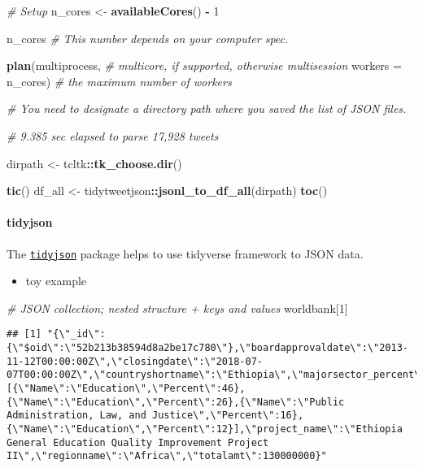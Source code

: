 \documentclass[
]{book}
\newenvironment{Shaded}{\begin{snugshade}}{\end{snugshade}}
\newcommand{\CommentTok}[1]{\textcolor[rgb]{0.56,0.35,0.01}{\textit{#1}}}
\newcommand{\DataTypeTok}[1]{\textcolor[rgb]{0.13,0.29,0.53}{#1}}
\newcommand{\DecValTok}[1]{\textcolor[rgb]{0.00,0.00,0.81}{#1}}
\newcommand{\KeywordTok}[1]{\textcolor[rgb]{0.13,0.29,0.53}{\textbf{#1}}}
\newcommand{\NormalTok}[1]{#1}
\newcommand{\OperatorTok}[1]{\textcolor[rgb]{0.81,0.36,0.00}{\textbf{#1}}}
\newcommand{\StringTok}[1]{\textcolor[rgb]{0.31,0.60,0.02}{#1}}
\providecommand{\tightlist}{%
  \setlength{\itemsep}{0pt}\setlength{\parskip}{0pt}}
\begin{document}
\begin{Shaded}
\begin{Highlighting}[]
\CommentTok{\# Setup }
\NormalTok{n\_cores \textless{}{-}}\StringTok{ }\KeywordTok{availableCores}\NormalTok{() }\OperatorTok{{-}}\StringTok{ }\DecValTok{1}

\NormalTok{n\_cores }\CommentTok{\# This number depends on your computer spec.}

\KeywordTok{plan}\NormalTok{(multiprocess, }\CommentTok{\# multicore, if supported, otherwise multisession}
     \DataTypeTok{workers =}\NormalTok{ n\_cores) }\CommentTok{\# the maximum number of workers}

\CommentTok{\# You need to designate a directory path where you saved the list of JSON files.}

\CommentTok{\# 9.385 sec elapsed to parse 17,928 tweets }

\NormalTok{dirpath \textless{}{-}}\StringTok{ }\NormalTok{tcltk}\OperatorTok{::}\KeywordTok{tk\_choose.dir}\NormalTok{()}

\KeywordTok{tic}\NormalTok{()}
\NormalTok{df\_all \textless{}{-}}\StringTok{ }\NormalTok{tidytweetjson}\OperatorTok{::}\KeywordTok{jsonl\_to\_df\_all}\NormalTok{(dirpath)}
\KeywordTok{toc}\NormalTok{()}
\end{Highlighting}
\end{Shaded}

\hypertarget{tidyjson}{%
\paragraph{tidyjson}\label{tidyjson}}

The \href{https://cran.r-project.org/web/packages/tidyjson/vignettes/introduction-to-tidyjson.html}{\texttt{tidyjson}} package helps to use tidyverse framework to JSON data.

\begin{itemize}
\tightlist
\item
  toy example
\end{itemize}

\begin{Shaded}
\begin{Highlighting}[]
\CommentTok{\# JSON collection; nested structure + keys and values }
\NormalTok{worldbank[}\DecValTok{1}\NormalTok{]}
\end{Highlighting}
\end{Shaded}

\begin{verbatim}
## [1] "{\"_id\":{\"$oid\":\"52b213b38594d8a2be17c780\"},\"boardapprovaldate\":\"2013-11-12T00:00:00Z\",\"closingdate\":\"2018-07-07T00:00:00Z\",\"countryshortname\":\"Ethiopia\",\"majorsector_percent\":[{\"Name\":\"Education\",\"Percent\":46},{\"Name\":\"Education\",\"Percent\":26},{\"Name\":\"Public Administration, Law, and Justice\",\"Percent\":16},{\"Name\":\"Education\",\"Percent\":12}],\"project_name\":\"Ethiopia General Education Quality Improvement Project II\",\"regionname\":\"Africa\",\"totalamt\":130000000}"
\end{verbatim}
\end{document}
